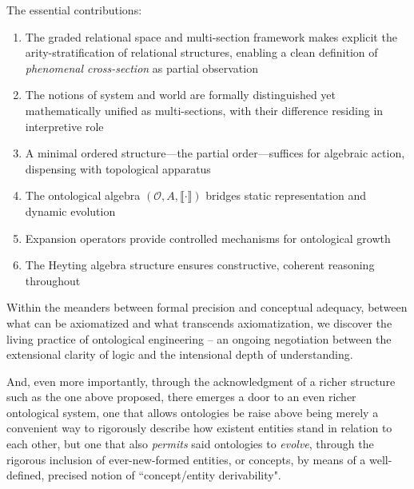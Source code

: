 \documentclass[12pt,a4paper]{article}
\newcommand{\onto}{\mathcal{O}}
\newcommand{\sem}[1]{\llbracket #1 \rrbracket}
\begin{document}
The essential contributions:
\begin{enumerate}
    \item The graded relational space and multi-section framework makes explicit the arity-stratification of relational structures, enabling a clean definition of \emph{phenomenal cross-section} as partial observation
    \item The notions of system and world are formally distinguished yet mathematically unified as multi-sections, with their difference residing in interpretive role
    \item A minimal ordered structure---the partial order---suffices for algebraic action, dispensing with topological apparatus
    \item The ontological algebra $(\onto, A, \sem{\cdot})$ bridges static representation and dynamic evolution
    \item Expansion operators provide controlled mechanisms for ontological growth
    \item The Heyting algebra structure ensures constructive, coherent reasoning throughout
\end{enumerate}

Within the meanders between formal precision and conceptual adequacy, between what can be axiomatized and what transcends axiomatization, we discover the living practice of ontological engineering -- an ongoing negotiation between the extensional clarity of logic and the intensional depth of understanding. 

And, even more importantly, through the acknowledgment of a richer structure such as the one above proposed, there emerges a door to an even richer ontological system, one that allows ontologies be raise above being merely a convenient way to rigorously describe how existent entities stand in relation to each other, but one that also \textit{permits} said ontologies to \textit{evolve}, through the rigorous inclusion of ever-new-formed entities, or concepts, by means of a well-defined, precised notion of ``concept/entity derivability".




\end{document}
